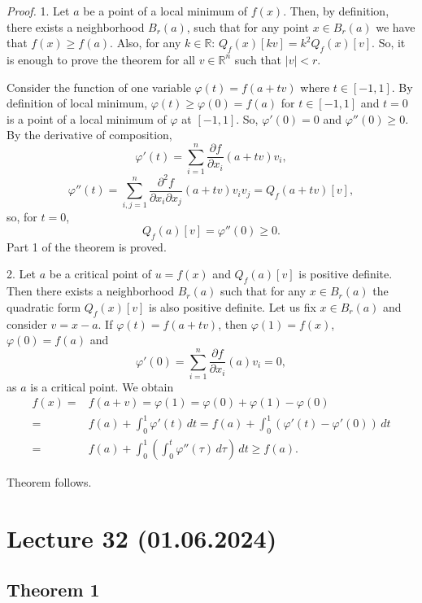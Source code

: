 \documentclass{article}
\begin{document}
\vspace{1em}

\textit{Proof.} 
1. Let $a$ be a point of a local minimum of $f(x)$. Then, by definition, there exists a neighborhood $B_r(a)$, such that for any point $x \in B_r(a)$ we have that $f(x) \geq f(a)$. Also, for any $k \in \mathbb{R}$: $Q_f(x) [kv] = k^2 Q_f(x) [v]$. So, it is enough to prove the theorem for all $v \in \mathbb{R}^n$ such that $|v| < r$.

Consider the function of one variable $\varphi(t) = f(a + tv)$ where $t \in [-1, 1]$. By definition of local minimum, $\varphi(t) \geq \varphi(0) = f(a)$ for $t \in [-1, 1]$ and $t = 0$ is a point of a local minimum of $\varphi$ at $[-1, 1]$. So, $\varphi'(0) = 0$ and $\varphi''(0) \geq 0$. By the derivative of composition,
\[
\varphi'(t) = \sum_{i=1}^{n} \frac{\partial f}{\partial x_i}(a + tv)v_i,
\]
\[
\varphi''(t) = \sum_{i,j=1}^{n} \frac{\partial^2 f}{\partial x_i \partial x_j}(a + tv)v_i v_j = Q_f(a + tv) [v],
\]
so, for $t = 0$,
\[
Q_f(a) [v] = \varphi''(0) \geq 0.
\]
Part 1 of the theorem is proved.

2. Let $a$ be a critical point of $u = f(x)$ and $Q_f(a)[v]$ is positive definite. Then there exists a neighborhood $B_r(a)$ such that for any $x \in B_r(a)$ the quadratic form $Q_f(x)[v]$ is also positive definite. Let us fix $x \in B_r(a)$ and consider $v = x - a$. If $\varphi(t) = f(a + tv)$, then $\varphi(1) = f(x)$, $\varphi(0) = f(a)$ and
\[
\varphi'(0) = \sum_{i=1}^{n} \frac{\partial f}{\partial x_i}(a)v_i = 0,
\]
as $a$ is a critical point. We obtain
\begin{equation}
    \begin{split}
    f(x) = & f(a + v) = \varphi(1) = \varphi(0) + \varphi(1) - \varphi(0) \\
    = & f(a) + \int_0^1 \varphi'(t) \, dt = f(a) + \int_0^1 (\varphi'(t) - \varphi'(0)) \, dt \\
    = & f(a) + \int_0^1 \left( \int_0^t \varphi''(\tau) \, d\tau \right) \, dt \geq f(a).
    \end{split}
\end{equation}

Theorem follows.

\section*{Lecture 32 (01.06.2024)}

\subsection*{Theorem 1}
\end{document}
